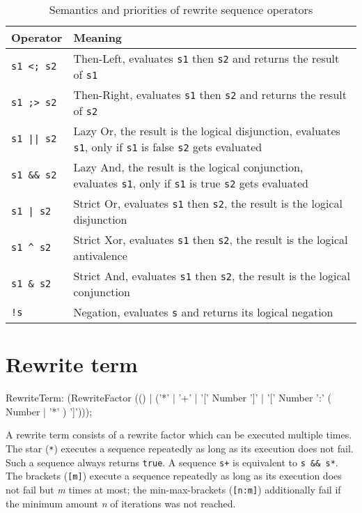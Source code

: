\begin{table}[htbp]
    \begin{tabularx}{\linewidth}{l|X}
        \bf Operator & \bf Meaning \\\hline\hline
        \verb/s1 <; s2/ & Then-Left, evaluates \texttt{s1} then \texttt{s2} and returns the result of \texttt{s1}\\
		\verb/s1 ;> s2/ & Then-Right, evaluates \texttt{s1} then \texttt{s2} and returns the result of \texttt{s2}\\\hline
        \verb/s1 || s2/ & Lazy Or, the result is the logical disjunction, evaluates \texttt{s1}, only if \texttt{s1} is false \texttt{s2} gets evaluated\\\hline
        \verb/s1 && s2/ & Lazy And, the result is the logical conjunction, evaluates \texttt{s1}, only if \texttt{s1} is true \texttt{s2} gets evaluated\\\hline
        \verb/s1 | s2/ & Strict Or, evaluates \texttt{s1} then \texttt{s2}, the result is the logical disjunction\\\hline
        \verb/s1 ^ s2/ & Strict Xor, evaluates \texttt{s1} then \texttt{s2}, the result is the logical antivalence\\\hline
        \verb/s1 & s2/ & Strict And, evaluates \texttt{s1} then \texttt{s2}, the result is the logical conjunction\\\hline
        \verb/!s/ & Negation, evaluates \texttt{s} and returns its logical negation\\\hline
	\end{tabularx}    
    \caption{Semantics and priorities of rewrite sequence operators}
    \label{tbl:sequ:op}
\end{table}


\section{Rewrite term}

\begin{rail}
  RewriteTerm: 
    (RewriteFactor (() | ('*' | '+' | '[' Number ']' | '[' Number ':' ( Number | '*' ) ']')));
\end{rail}

A rewrite term consists of a rewrite factor which can be executed multiple times.
The star (\texttt{*}) executes a sequence repeatedly as long as its execution does not fail. 
Such a sequence always returns \texttt{true}.
A sequence \verb#s+# is equivalent to \verb#s && s*#.
The brackets (\texttt{[m]}) execute a sequence repeatedly as long as its execution does not fail but \emph{m} times at most;
the min-max-brackets (\texttt{[n:m]}) additionally fail if the minimum amount \emph{n} of iterations was not reached.


